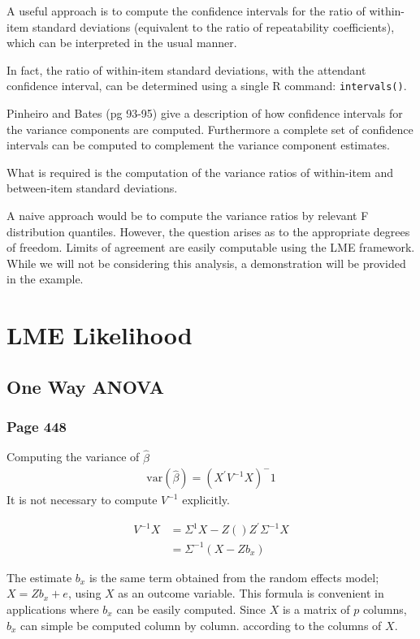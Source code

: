 \documentclass[12pt, a4paper]{report}
\theoremstyle{plain}
\theoremstyle{definition}
\theoremstyle{remark}
\begin{document}
A useful approach is to compute the confidence intervals for the ratio of within-item standard deviations (equivalent to the ratio of repeatability coefficients), which can be interpreted in the usual manner.  

In fact, the ratio of within-item standard deviations, with the attendant confidence interval,  can be determined using a single R command: \texttt{intervals()}.

Pinheiro and Bates (pg 93-95) give a description of how confidence intervals for the variance components are computed. Furthermore a complete set of confidence intervals can be computed to complement the variance component estimates. 

What is required is the computation of the variance ratios of within-item and between-item standard deviations.  

A naive  approach would be to compute the variance ratios by relevant F distribution quantiles. However, the question arises as to the appropriate degrees of freedom.
Limits of agreement are easily computable using the LME framework. While we will not be considering this analysis, a demonstration will be provided in the example.



	\chapter{LME Likelihood}
	\section{One Way ANOVA}
	\subsection{Page 448}
	Computing the variance of $\hat{\beta}$
	\begin{eqnarray}
	\mbox{var}(\hat{\beta}) = (X^{\prime}V^{-1}X)^-1
	\end{eqnarray}
	It is not necessary to compute $V^{-1}$ explicitly.
	
	\begin{eqnarray}
	V^{-1}X &= \Sigma^{1}{X-Z()Z^{\prime}\Sigma^{-1}X} \\
	&= \Sigma^{-1}(X-Zb_{x})
	\end{eqnarray}
	
	The estimate $b_{x}$ is the same term obtained from the random effects model; $X = Zb_{x} + e$, using $X$ as an outcome variable.
	This formula is convenient in applications where $b_{x}$ can be easily computed. Since $X$ is a matrix of $p$ columns, $b_{x}$ can simple be computed column by column. according to the columns of $X$.
\end{document}
